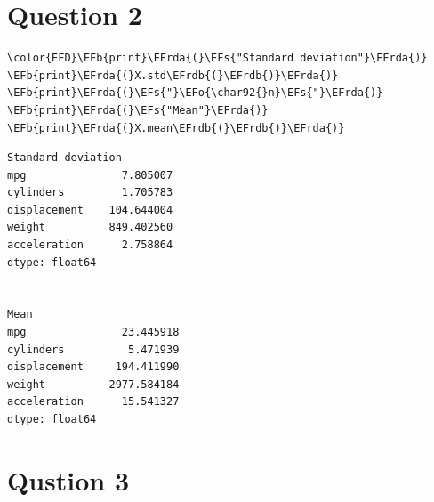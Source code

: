 \documentclass[11pt]{article}
\newcommand{\EFs}[1]{\textcolor{EFs}{#1}} %
\newcommand{\EFb}[1]{\textcolor{EFb}{#1}} %
\newcommand{\EFo}[1]{\textcolor{EFo}{#1}} %
\newcommand{\EFrda}[1]{\textcolor{EFrda}{#1}} %
\newcommand{\EFrdb}[1]{\textcolor{EFrdb}{#1}} %
\begin{document}
\section*{Question 2}
\label{sec:org55b33e6}



\begin{Code}
\begin{Verbatim}
\color{EFD}\EFb{print}\EFrda{(}\EFs{"Standard deviation"}\EFrda{)}
\EFb{print}\EFrda{(}X.std\EFrdb{(}\EFrdb{)}\EFrda{)}
\EFb{print}\EFrda{(}\EFs{"}\EFo{\char92{}n}\EFs{"}\EFrda{)}
\EFb{print}\EFrda{(}\EFs{"Mean"}\EFrda{)}
\EFb{print}\EFrda{(}X.mean\EFrdb{(}\EFrdb{)}\EFrda{)}
\end{Verbatim}
\end{Code}

\begin{verbatim}
Standard deviation
mpg               7.805007
cylinders         1.705783
displacement    104.644004
weight          849.402560
acceleration      2.758864
dtype: float64


Mean
mpg               23.445918
cylinders          5.471939
displacement     194.411990
weight          2977.584184
acceleration      15.541327
dtype: float64
\end{verbatim}

\section*{Qustion 3}
\label{sec:orgc5c61c2}
\end{document}
